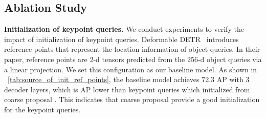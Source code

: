 \documentclass[runningheads]{llncs}
\begin{document}
        

























        




\subsection{Ablation Study}



























\noindent\textbf{Initialization of keypoint queries.} 
We conduct experiments to verify the impact of initialization of keypoint queries. Deformable DETR~\cite{zhu2020deformable} introduces reference points that represent the location information of object queries. In their paper, reference points are 2-d tensors predicted from the 256-d object queries via a linear projection. We set this configuration as our baseline model. As shown in ~\cref{tab:source_of_init_ref_points}, the baseline model achieves 72.3 AP with 3 decoder layers, which is  AP lower than keypoint queries which initialized from coarse proposal .
This indicates that coarse proposal  provide a good initialization for the keypoint queries.
\end{document}
